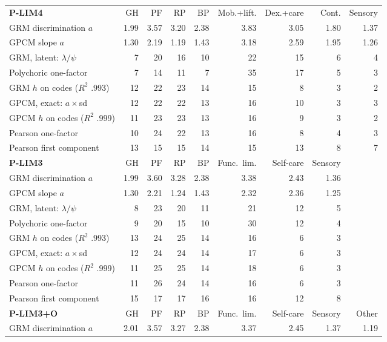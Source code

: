 \begin{center}\footnotesize\setlength{\tabcolsep}{4pt}
\begin{tabular}{@{}lrrrrrrrr@{}}
\toprule
\textbf{P-LIM4} & GH & PF & RP & BP & Mob.+lift. & Dex.+care & Cont. & Sensory \\
\cmidrule(l){2-9}
GRM discrimination $a$ & 1.99 & 3.57 & 3.20 & 2.38 & 3.83 & 3.05 & 1.80 & 1.37 \\
GPCM slope $a$ & 1.30 & 2.19 & 1.19 & 1.43 & 3.18 & 2.59 & 1.95 & 1.26 \\
GRM, latent: $\lambda/\psi$ & 7 & 20 & 16 & 10 & 22 & 15 & 6 & 4 \\
Polychoric one-factor & 7 & 14 & 11 & 7 & 35 & 17 & 5 & 3 \\
GRM $h$ on codes ($R^2$ .993) & 12 & 22 & 23 & 14 & 15 & 8 & 3 & 2 \\
GPCM, exact: $a\times$sd & 12 & 22 & 22 & 13 & 16 & 10 & 3 & 3 \\
GPCM $h$ on codes ($R^2$ .999) & 11 & 23 & 23 & 13 & 16 & 9 & 3 & 2 \\
Pearson one-factor & 10 & 24 & 22 & 13 & 16 & 8 & 4 & 3 \\
Pearson first component & 13 & 15 & 15 & 14 & 15 & 13 & 8 & 7 \\
\midrule
\textbf{P-LIM3} & GH & PF & RP & BP & Func.\ lim. & Self-care & Sensory &  \\
\cmidrule(l){2-8}
GRM discrimination $a$ & 1.99 & 3.60 & 3.28 & 2.38 & 3.38 & 2.43 & 1.36 &  \\
GPCM slope $a$ & 1.30 & 2.21 & 1.24 & 1.43 & 2.32 & 2.36 & 1.25 &  \\
GRM, latent: $\lambda/\psi$ & 8 & 23 & 20 & 11 & 21 & 12 & 5 &  \\
Polychoric one-factor & 9 & 20 & 15 & 10 & 30 & 12 & 4 &  \\
GRM $h$ on codes ($R^2$ .993) & 13 & 24 & 25 & 14 & 16 & 6 & 3 &  \\
GPCM, exact: $a\times$sd & 12 & 24 & 24 & 14 & 17 & 6 & 3 &  \\
GPCM $h$ on codes ($R^2$ .999) & 11 & 25 & 25 & 14 & 18 & 6 & 3 &  \\
Pearson one-factor & 11 & 26 & 24 & 14 & 16 & 6 & 3 &  \\
Pearson first component & 15 & 17 & 17 & 16 & 16 & 12 & 8 &  \\
\midrule
\textbf{P-LIM3+O} & GH & PF & RP & BP & Func.\ lim. & Self-care & Sensory & Other \\
\cmidrule(l){2-9}
GRM discrimination $a$ & 2.01 & 3.57 & 3.27 & 2.38 & 3.37 & 2.45 & 1.37 & 1.19 \\

\end{tabular}
\end{center}
